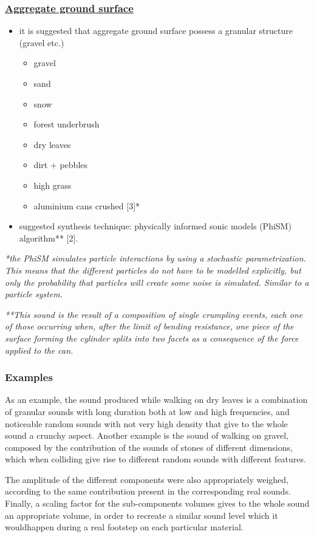 \documentclass[11pt]{article}
\begin{document}
\subsubsection{\textbf{\underline{Aggregate ground surface}}}
\label{sec:orgde74350}
\begin{itemize}
\item it is suggested that aggregate ground surface possess a granular structure (gravel etc.)
\begin{itemize}
\item gravel
\item sand
\item snow
\item forest underbrush
\item dry leaves
\item dirt + pebbles
\item high grass
\item aluminium cans crushed [3]*
\end{itemize}
\item suggested synthesis technique: physically informed sonic models (PhiSM) algorithm** [2].
\end{itemize}

\emph{*the PhiSM simulates particle interactions by using a stochastic parametrization. This means that the different particles do not have to be modelled explicitly, but only the probability that particles will create some noise is simulated. Similar to a particle system.}

\emph{**This sound is the result of a composition of single crumpling events, each one of those occurring when, after the limit of bending resistance, one piece of the surface forming the cylinder splits into two facets as a consequence of the force applied to the can.}

\subsubsection{Examples}
\label{sec:org50c7898}
As an example, the sound produced while walking on dry leaves is a combination of granular sounds with long duration both at low and high frequencies, and noticeable random sounds with not very high density that give to the whole sound a crunchy aspect. Another example is the sound of walking on gravel, composed by the contribution of the sounds of stones of different dimensions, which when colliding give rise to different random sounds with different features.

The amplitude of the different components were also appropriately weighed, according to the same contribution present in the corresponding real sounds. Finally, a scaling factor for the sub-components volumes gives to the whole sound an appropriate volume, in order to recreate a similar sound level which it wouldhappen during a real footstep on each particular material.
\end{document}
